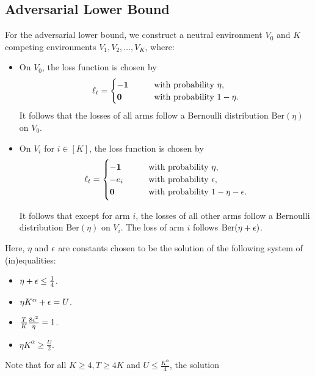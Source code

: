 \subsection{Adversarial Lower Bound}
For the adversarial lower bound, we construct a neutral environment $V_0$ and $K$ competing environments $V_1, V_2, \dots, V_K$, where:
\begin{itemize}
    \item On $V_0$, the loss function is chosen by
        \begin{align*}
            \ell_t = \begin{cases}
                -\bm{1} &\qquad\text{with probability } \eta,\\
                \mathbf{0} &\qquad\text{with probability } 1-\eta.
            \end{cases}
        \end{align*}
    It follows that the losses of all arms follow a Bernoulli distribution $\mathrm{Ber}(\eta)$ on $V_0$.

    \item On $V_i$ for $i \in [K]$, the loss function is chosen by
        \begin{align*}
            \ell_t = \begin{cases}
                -\bm{1} &\qquad\text{with probability } \eta,\\
                -e_{i} &\qquad\text{with probability } {\epsilon}, \\
                \mathbf{0} &\qquad\text{with probability } 1-\eta-{\epsilon}.
            \end{cases}
        \end{align*}

        It follows that except for arm $i$, the losses of all other arms follow a Bernoulli distribution $\mathrm{Ber}(\eta)$ on $V_i$. The loss of arm $i$ follows $\mathrm{Ber}(\eta + {\epsilon})$.
\end{itemize}
Here, $\eta$ and ${\epsilon}$ are constants chosen to be the solution of the following system of (in)equalities:
\begin{itemize}
    \item $\eta + {\epsilon} \leq \frac{1}{4}$.
    \item $\eta K^\alpha + {\epsilon} = U$.
    \item $\frac{T}{K}\frac{8{\epsilon}^2}{\eta} = 1$.
    \item $\eta K^\alpha \geq \frac{U}{2}$.
\end{itemize}
Note that for all $K \geq 4, T \geq 4K$ and $U \leq \frac{K^\alpha}{4}$, the solution 
